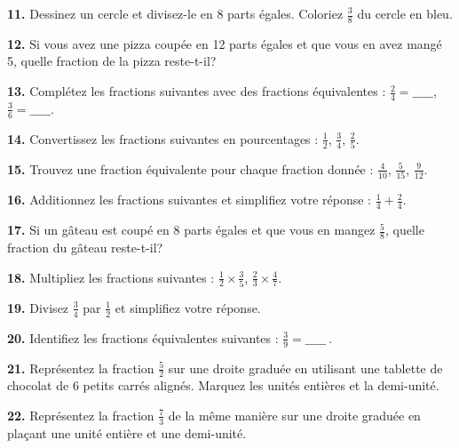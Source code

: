 \documentclass{article}
\begin{document}
\vspace{0.2cm}
\begin{tcolorbox}[colback=purple!10!white, colframe=yellow!75!black, title=\textcolor{white}{Exercices d'Application}, sharp corners=south, boxrule=0.8mm]
    \textbf{11.} Dessinez un cercle et divisez-le en 8 parts égales. Coloriez \(\frac{3}{8}\) du cercle en bleu.

    \textbf{12.} Si vous avez une pizza coupée en 12 parts égales et que vous en avez mangé 5, quelle fraction de la pizza reste-t-il?

    \textbf{13.} Complétez les fractions suivantes avec des fractions équivalentes : \(\frac{2}{4} = \_\_\_\_\_\), \(\frac{3}{6} = \_\_\_\_\_\).

    \textbf{14.} Convertissez les fractions suivantes en pourcentages : \(\frac{1}{2}\), \(\frac{3}{4}\), \(\frac{2}{5}\).

    \textbf{15.} Trouvez une fraction équivalente pour chaque fraction donnée : \(\frac{4}{10}\), \(\frac{5}{15}\), \(\frac{9}{12}\).

    \textbf{16.} Additionnez les fractions suivantes et simplifiez votre réponse : \(\frac{1}{4} + \frac{2}{4}\).

    \textbf{17.} Si un gâteau est coupé en 8 parts égales et que vous en mangez \(\frac{5}{8}\), quelle fraction du gâteau reste-t-il?

    \textbf{18.} Multipliez les fractions suivantes : \(\frac{1}{2} \times \frac{3}{5}\), \(\frac{2}{3} \times \frac{4}{7}\).

    \textbf{19.} Divisez \(\frac{3}{4}\) par \(\frac{1}{2}\) et simplifiez votre réponse.

    \textbf{20.} Identifiez les fractions équivalentes suivantes : \(\frac{3}{9} = \_\_\_\_\_\ \).

    \textbf{21.} Représentez la fraction \(\frac{5}{2}\) sur une droite graduée en utilisant une tablette de chocolat de 6 petits carrés alignés. Marquez les unités entières et la demi-unité.

    \textbf{22.} Représentez la fraction \(\frac{7}{3}\) de la même manière sur une droite graduée en plaçant une unité entière et une demi-unité.
\end{tcolorbox}
\end{document}

